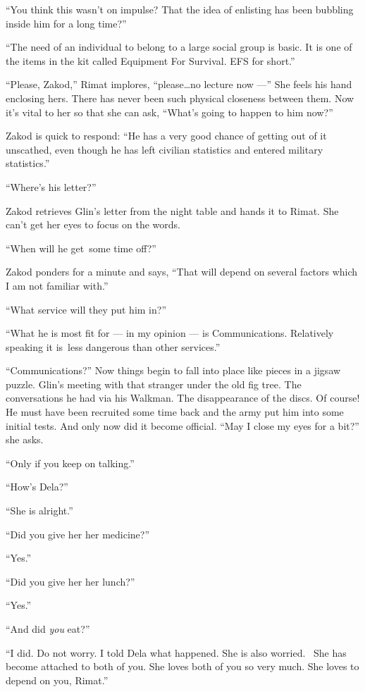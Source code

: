\documentclass[twoside,11pt,openany]{book}
\begin{document}
{}``You think this wasn't on impulse? That the idea of enlisting has been bubbling inside him for a long
time?''

``The need of an individual to belong to a large social group is basic. It is one of the items in the kit
called Equipment For Survival. EFS for short.''

``Please, Zakod,'' Rimat implores, ``please{\ldots}no lecture now ---'' She feels his hand enclosing hers. There has
never been such physical closeness between them. Now it's vital to her so that she can ask,
``What's going to happen to him now?''

Zakod is quick to respond: ``He has a very good chance of getting out of it unscathed, even though he has
left civilian statistics and entered military statistics.''

``Where's his letter?''

Zakod retrieves Glin's letter from the night table and hands it to Rimat. She can't get her eyes to focus on the
words.

 ``When will he get~some time off?''

Zakod ponders for a minute and says, ``That will depend on several factors which I am not familiar with.''

{}``What service will they put him in?{}''

{}``What he is most fit for --- in my opinion --- is Communications. Relatively speaking it is~less dangerous than other
services.''

{}``Communications?'' Now things begin to fall into place like pieces in a jigsaw puzzle. Glin's meeting with that
stranger under the old fig tree. The conversations he had via his Walkman. The disappearance of the discs. Of course!
He must have been recruited some time back and the army put him into some initial tests. And only now did it become
official. ``May I close my eyes for a bit?'' she asks.

{}``Only if you keep on talking.''

``How's Dela?''

{}``She is alright.''

{}``Did you give her her medicine?''

{}``Yes.''

{}``Did you give her{ }her lunch?''

{}``Yes.''

{}``And did \textit{you} eat?''

{}``I did. Do not worry. I told Dela what happened. She is also worried.~ She has become attached to both of you. She
loves both of you so very much. She loves to depend on you, Rimat.{}''
\end{document}
